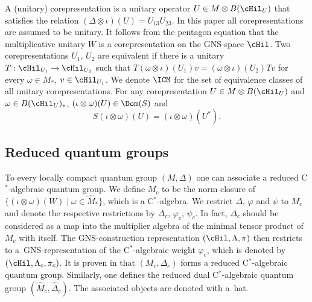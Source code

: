 A (unitary) corepresentation is a unitary operator $U \in M \otimes B(\cHil_U)$ that satisf\/ies the relation $(\Delta \otimes \iota) (U) = U_{13}U_{23}$. In this paper all corepresentations are assumed to be unitary. It follows from the pentagon equation that the multiplicative unitary $W$ is a corepresentation on the GNS-space $\cHil$. Two corepresentations $U_1$, $U_2$ are equivalent if there is a unitary $T: \cHil_{U_1} \rightarrow \cHil_{U_2}$ such that $T (\omega \otimes \iota)(U_1) v = (\omega \otimes \iota)(U_2) T v$ for every $\omega \in M_\ast$, $v \in \cHil_{U_1}$. We denote $\ICM$ for the set of equivalence classes of all unitary corepresentations. For any corepresentation $U \in M \otimes B(\cHil_U)$ and $\omega \in B(\cHil_U)_\ast$, $(\iota \otimes \omega)(U) \in \Dom(S)$ and
\[
S (\iota \otimes \omega)(U) = (\iota \otimes \omega)(U^\ast) .
\]

\subsection*{Reduced quantum groups}
To every locally compact quantum group $(M, \Delta)$ one can associate a reduced C$^\ast$-algebraic quantum group. We def\/ine $M_c$ to be the norm closure of $\{ (\iota \otimes \omega)(W) \mid \omega \in \hat{M}_\ast \}$, which is a C$^\ast$-algebra. We restrict $\Delta$, $\varphi$ and $\psi$ to $M_c$ and denote the respective restrictions by $\Delta_c$, $\varphi_c$, $\psi_c$. In fact, $\Delta_c$ should be considered as a map into the multiplier algebra of the minimal tensor product of $M_c$ with itself. The GNS-construction representation $(\cHil, \Lambda, \pi)$ then restricts to a~GNS-representation of the C$^\ast$-algebraic weight $\varphi_c$, which is denoted by $(\cHil, \Lambda_c, \pi_c)$.
It is proven in \cite{KusVae} that $(M_c, \Delta_c)$ forms a reduced C$^\ast$-algebraic quantum group.
Similarly, one def\/ines the reduced dual  C$^\ast$-algebraic quantum group $(\hat{M}_c, \hat{\Delta}_c)$. The associated objects are denoted with a~hat.

